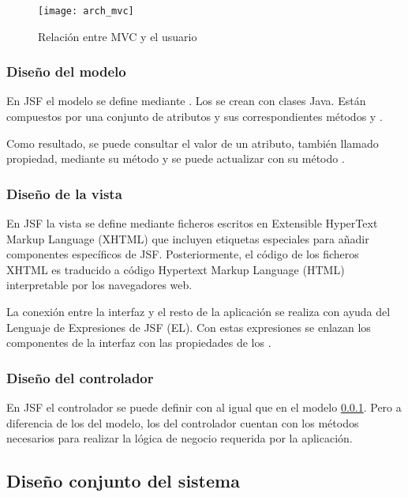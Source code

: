 \begin{figure}[H]
  \centering
  \texttt{[image: arch\_mvc]}
  \caption{Relación entre MVC y el usuario} \label{fig:mvc}
\end{figure}

\subsubsection{Diseño del modelo} \label{sec:arch-modelo}
En JSF el modelo se define mediante . Los
 se crean con clases Java. Están compuestos por una
conjunto de atributos y sus correspondientes métodos 
 y .

Como resultado, se puede consultar el valor de un atributo, también llamado
propiedad, mediante su método  y se puede actualizar con su
método .

\subsubsection{Diseño de la vista} \label{sec:arch-vista}
En JSF la vista se define mediante ficheros escritos en Extensible HyperText
Markup Language (XHTML) que incluyen etiquetas especiales para añadir
componentes específicos de JSF. Posteriormente, el código de los ficheros XHTML
es traducido a código Hypertext Markup Language (HTML) interpretable por los
navegadores web.

La conexión entre la interfaz y el resto de la aplicación se realiza con ayuda
del Lenguaje de Expresiones de JSF (EL). Con estas expresiones se enlazan los
componentes de la interfaz con las propiedades de los .

\subsubsection{Diseño del controlador} \label{sec:arch-ctl}
En JSF el controlador se puede definir con  al igual
que en el modelo \ref{sec:arch-modelo}. Pero a diferencia de los
 del modelo, los  del controlador
cuentan con los métodos necesarios para realizar la lógica de negocio
requerida por la aplicación.

\subsection{Diseño conjunto del sistema} \label{sec:design-comp}

